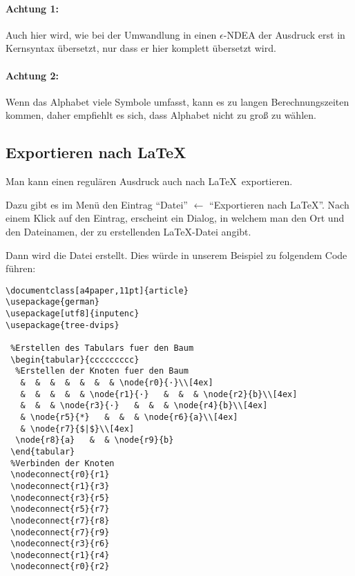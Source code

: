 \paragraph*{Achtung 1:} Auch hier wird, wie bei der Umwandlung in einen $\epsilon$-NDEA der Ausdruck erst in Kernsyntax übersetzt, nur dass er hier komplett übersetzt wird.

\paragraph*{Achtung 2:} Wenn das Alphabet viele Symbole umfasst, kann es zu langen Berechnungszeiten kommen, daher empfiehlt es sich, dass Alphabet nicht zu groß zu wählen.

\subsection{Exportieren nach \LaTeX}

Man kann einen regulären Ausdruck auch nach \LaTeX \ exportieren.

Dazu gibt es im Menü den Eintrag "`Datei"' $\leftarrow$ "`Exportieren nach LaTeX"'. Nach einem Klick auf den Eintrag, erscheint ein Dialog, in welchem man den Ort und den Dateinamen, der zu erstellenden \LaTeX-Datei angibt.

Dann wird die Datei erstellt. Dies würde in unserem Beispiel zu folgendem Code führen:

\begin{verbatim}
\documentclass[a4paper,11pt]{article}
\usepackage{german}
\usepackage[utf8]{inputenc}
\usepackage{tree-dvips}

 %Erstellen des Tabulars fuer den Baum
 \begin{tabular}{ccccccccc}
  %Erstellen der Knoten fuer den Baum
   &  &  &  &  &  &  & \node{r0}{·}\\[4ex]
   &  &  &  &  & \node{r1}{·}   &  &  & \node{r2}{b}\\[4ex]
   &  &  & \node{r3}{·}   &  &  & \node{r4}{b}\\[4ex]
   & \node{r5}{*}   &  &  & \node{r6}{a}\\[4ex]
   & \node{r7}{$|$}\\[4ex]
  \node{r8}{a}   &  & \node{r9}{b}
 \end{tabular}
 %Verbinden der Knoten
 \nodeconnect{r0}{r1}
 \nodeconnect{r1}{r3}
 \nodeconnect{r3}{r5}
 \nodeconnect{r5}{r7}
 \nodeconnect{r7}{r8}
 \nodeconnect{r7}{r9}
 \nodeconnect{r3}{r6}
 \nodeconnect{r1}{r4}
 \nodeconnect{r0}{r2}


\end{verbatim}

